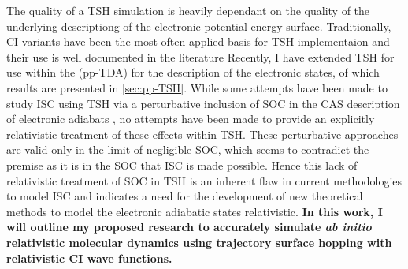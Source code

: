 The quality of a TSH simulation is heavily dependant on the quality of the
underlying descriptiong of the electronic potential energy surface.
Traditionally, CI variants have been the most often applied basis for TSH
implementaion and their use is well documented in the literature
Recently, I have extended TSH for use within the (pp-TDA) for the description of
the electronic states\cite{DBWY16_Submitted1}, of which results are presented in
\cref{sec:pp-TSH}.
While some attempts have been made to study ISC using TSH via
a perturbative inclusion of SOC in the CAS description of electronic adiabats 
\cite{Thiel14_JCP124101}, no attempts have been made to provide an explicitly
relativistic treatment of these effects within TSH. These perturbative
approaches are valid only in the limit of negligible SOC, which seems to
contradict the premise as it is in the SOC that ISC is made possible. Hence this
lack of relativistic treatment of SOC in TSH is an inherent flaw in current
methodologies to model ISC and indicates a need for the development of new
theoretical methods to model the electronic adiabatic states relativistic.
{\bf 
In this work, I will outline my proposed research to accurately simulate
\emph{ab initio} relativistic molecular dynamics using trajectory surface
hopping with relativistic CI wave functions.
}

